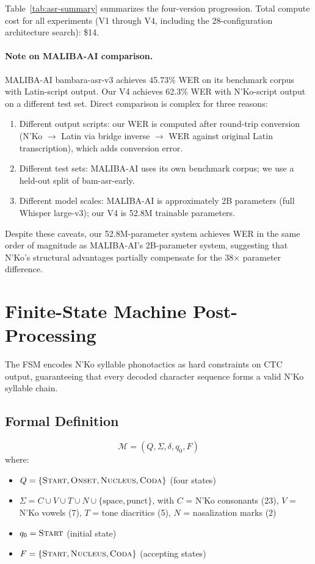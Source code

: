 \documentclass[11pt]{article}
\begin{document}
Table~\ref{tab:asr-summary} summarizes the four-version progression.
Total compute cost for all experiments (V1 through V4, including the 28-configuration architecture search): \$14.

\paragraph{Note on MALIBA-AI comparison.}
MALIBA-AI bambara-asr-v3 achieves 45.73\% WER on its benchmark corpus with Latin-script output.
Our V4 achieves 62.3\% WER with N'Ko-script output on a different test set.
Direct comparison is complex for three reasons:
\begin{enumerate}
\item Different output scripts: our WER is computed after round-trip conversion (N'Ko $\to$ Latin via bridge inverse $\to$ WER against original Latin transcription), which adds conversion error.
\item Different test sets: MALIBA-AI uses its own benchmark corpus; we use a held-out split of bam-asr-early.
\item Different model scales: MALIBA-AI is approximately 2B parameters (full Whisper large-v3); our V4 is 52.8M trainable parameters.
\end{enumerate}
Despite these caveats, our 52.8M-parameter system achieves WER in the same order of magnitude as MALIBA-AI's 2B-parameter system, suggesting that N'Ko's structural advantages partially compensate for the 38$\times$ parameter difference.

\section{Finite-State Machine Post-Processing}
\label{sec:fsm}

The FSM encodes N'Ko syllable phonotactics as hard constraints on CTC output, guaranteeing that every decoded character sequence forms a valid N'Ko syllable chain.

\subsection{Formal Definition}

\begin{equation}
\mathcal{M} = (Q, \Sigma, \delta, q_0, F)
\end{equation}
where:
\begin{itemize}
\item $Q = \{\textsc{Start}, \textsc{Onset}, \textsc{Nucleus}, \textsc{Coda}\}$ (four states)
\item $\Sigma = C \cup V \cup T \cup N \cup \{\text{space}, \text{punct}\}$, with $C$ = N'Ko consonants (23), $V$ = N'Ko vowels (7), $T$ = tone diacritics (5), $N$ = nasalization marks (2)
\item $q_0 = \textsc{Start}$ (initial state)
\item $F = \{\textsc{Start}, \textsc{Nucleus}, \textsc{Coda}\}$ (accepting states)
\end{itemize}
\end{document}
